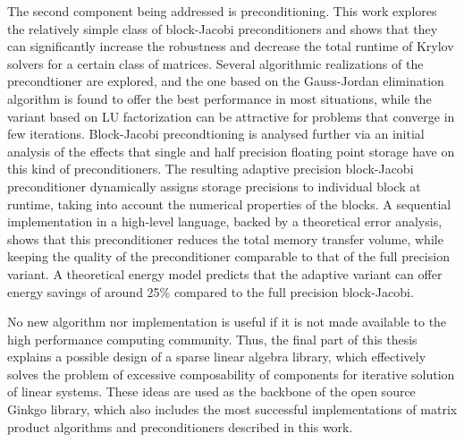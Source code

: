 The second component being addressed is preconditioning. This work explores the
relatively simple class of block-Jacobi preconditioners and shows that they can
significantly increase the robustness and decrease the total runtime of Krylov
solvers for a certain class of matrices. Several algorithmic realizations of the
precondtioner are explored, and the one based on the Gauss-Jordan elimination
algorithm is found to offer the best performance in most situations, while the
variant based on LU factorization can be attractive for problems that converge
in few iterations.  Block-Jacobi precondtioning is analysed further via an
initial analysis of the effects that single and half precision floating point
storage have on this kind of preconditioners. The resulting adaptive precision
block-Jacobi preconditioner dynamically assigns storage precisions to individual
block at runtime, taking into account the numerical properties of the blocks. A
sequential implementation in a high-level language, backed by a theoretical
error analysis, shows that this preconditioner reduces the total memory transfer
volume, while keeping the quality of the preconditioner comparable to that of
the full precision variant. A theoretical energy model predicts that the
adaptive variant can offer energy savings of around 25\% compared to the full
precision block-Jacobi.

No new algorithm nor implementation is useful if it is not made available to the
high performance computing community. Thus, the final part of this thesis
explains a possible design of a sparse linear algebra library, which effectively
solves the problem of excessive composability of components for iterative
solution of linear systems. These ideas are used as the backbone of the open
source Ginkgo library, which also includes the most successful implementations
of matrix product algorithms and preconditioners described in this work.
